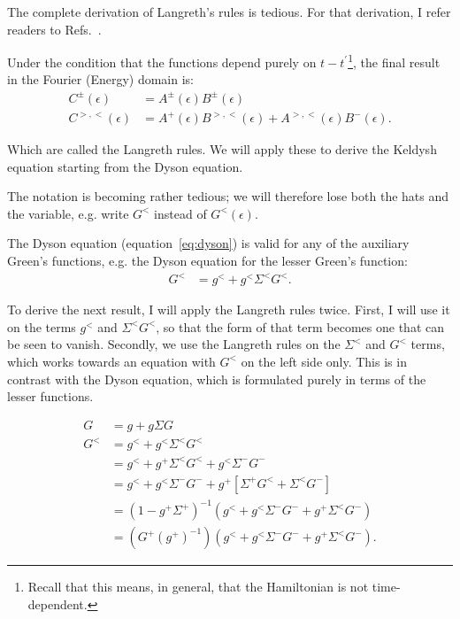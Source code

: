 The complete derivation of Langreth's rules is tedious. For that derivation, I refer readers to Refs.~\cite{mattuck,haugjauho}.
 
Under the condition that the functions depend purely on $t-t^\prime$\footnote{Recall that this means, in general, that the Hamiltonian is not time-dependent.}, the final result in the Fourier (Energy) domain is:
\begin{align*}
C^\pm (\epsilon) &= 
A^\pm (\epsilon) 
B^\pm (\epsilon) \\
C^{>,<} (\epsilon) &= 
A^+ (\epsilon) 
B^{>,<} (\epsilon) + 
A^{>,<} (\epsilon) 
B^- (\epsilon).
\end{align*}

Which are called the Langreth rules. We will apply these to derive the Keldysh equation starting from the Dyson equation.
 
The notation is becoming rather tedious; we will therefore lose both the hats and the variable, e.g. write $G^<$ instead of $G^<(\epsilon)$.

The Dyson equation (equation~\ref{eq:dyson}) is valid for any of the auxiliary Green's functions, e.g. the Dyson equation for the lesser Green's function:
\begin{align*}
G^< &= g^< + g^< \Sigma^< G^< . 
\end{align*}

To derive the next result, I will apply the Langreth rules twice. First, I will use it on the terms $g^<$ and $\Sigma^< G^<$, so that the form of that term becomes one that can be seen to vanish. Secondly, we use the Langreth rules on the $\Sigma^<$ and $G^<$ terms, which works towards an equation with $G^<$ on the left side only. This is in contrast with the Dyson equation, which is formulated purely in terms of the lesser functions.

\begin{align*}
G &= g + g\Sigma G \\
G^< &= g^<  + g^< \Sigma^< G^< \\
 &= g^<  + g^+ \Sigma^< G^< + g^< \Sigma^- G^- \\
 &= g^<  + g^< \Sigma^- G^- + g^+ \left[ \Sigma^+ G^< + \Sigma^< G^- \right]\\
 &= (1 - g^+ \Sigma^+)^{-1} \left( g^<  + g^< \Sigma^- G^- + g^+ \Sigma^< G^-\right) \\
 &= \left(G^+ (g^+)^{-1}\right)\left( g^<  + g^< \Sigma^- G^- + g^+ \Sigma^< G^-\right).
\end{align*}

